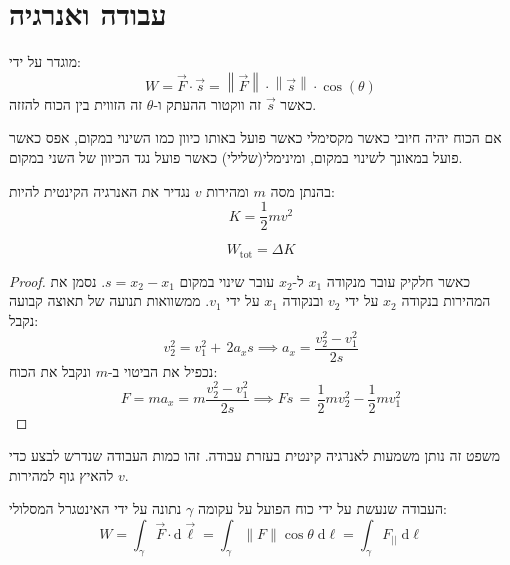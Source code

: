 \documentclass{tstextbook}
\begin{document}
\section{עבודה ואנרגיה}

\begin{definition}
מוגדר על ידי:
$$W=\vec{F}\cdot \vec{s}=\left\lVert  \vec{F}  \right\rVert \cdot \left\lVert  \vec{s}  \right\rVert \cdot \cos\left( \theta \right)$$
כאשר \(\vec{s}\) זה ווקטור ההעתק ו-\(\theta\) זה הזווית בין הכוח להזזה.

\end{definition}
\begin{corollary}
אם הכוח יהיה חיובי כאשר מקסימלי כאשר פועל באותו כיוון כמו השינוי במקום, אפס כאשר פועל במאונך לשינוי במקום, ומינימלי(שלילי) כאשר פועל נגד הכיוון של השני במקום.

\end{corollary}
\begin{definition}
בהנתן מסה \(m\) ומהירות \(v\) נגדיר את האנרגיה הקינטית להיות:
$$K=\frac{1}{2}mv^{2}$$

\end{definition}
\begin{proposition}
$$W_{\text{tot}}=\Delta K$$

\end{proposition}
\begin{proof}
כאשר חלקיק עובר מנקודה \(x_{1}\) ל-\(x_{2}\) עובר שינוי במקום \(s=x_{2}-x_{1}\). נסמן את המהירות בנקודה \(x_{2}\) על ידי \(v_{2}\) ובנקודה \(x_{1}\) על ידי \(v_{1}\). ממשוואות תנועה של תאוצה קבועה נקבל:
$$v_{2}^{2\!}=v_{1}^{2}+\,2a_{x}s\implies a_{x}={\frac{v_{2}^{2}-{v_{1}^{2}}}{2s}}$$
נכפיל את הביטוי ב-\(m\) ונקבל את הכוח:
$$F=m a_{x}=m{\frac{v_{2}^{2}-v_{1}^{2}}{2s}}\implies F s\,=\,{{\frac{1}{2}}}m v_{2}^{2}-{\frac{1}{2}}m v_{1}^{2}$$

\end{proof}
\begin{remark}
משפט זה נותן משמעות לאנרגיה קינטית בעזרת עבודה. זהו כמות העבודה שנדרש לבצע כדי להאיץ גוף למהירות \(v\).

\end{remark}
\begin{proposition}
העבודה שנעשת על ידי כוח הפועל על עקומה \(\gamma\) נתונה על ידי האינטגרל המסלולי:
$$W=\int_{\gamma} \vec{F} \cdot \mathrm{d}\vec{\ell}=\int _{\gamma}\lVert F \rVert \cos \theta \;\mathrm{d} \ell=\int _{\gamma}F_{||} \;\mathrm{d} \ell   $$

\end{proposition}
\end{document}

